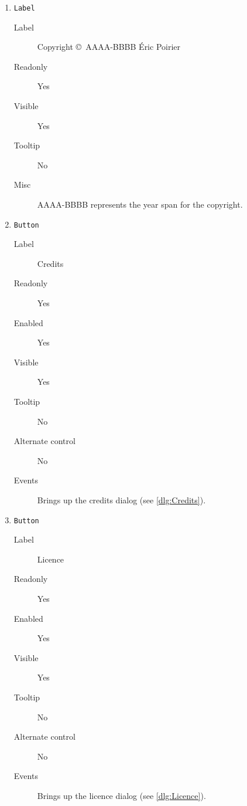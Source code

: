 \begin{enumerate}
    \item \texttt{Label}
              \begin{description}
                  \item[Label] Copyright \copyright~AAAA-BBBB Éric Poirier
                  \item[Readonly] Yes
                  \item[Visible] Yes
                  \item[Tooltip] No
                  \item[Misc] AAAA-BBBB represents the year span for the copyright.
              \end{description}

    \item \texttt{Button}
              \begin{description}
                  \item[Label] Credits
                  \item[Readonly] Yes
                  \item[Enabled] Yes
                  \item[Visible] Yes
                  \item[Tooltip] No
                  \item[Alternate control] No
                  \item[Events] Brings up the credits dialog
                                (see \cref{dlg:Credits}).
              \end{description}

    \item \texttt{Button}
              \begin{description}
                  \item[Label] Licence
                  \item[Readonly] Yes
                  \item[Enabled] Yes
                  \item[Visible] Yes
                  \item[Tooltip] No
                  \item[Alternate control] No
                  \item[Events] Brings up the licence dialog
                                (see \cref{dlg:Licence}).
              \end{description}


\end{enumerate}
